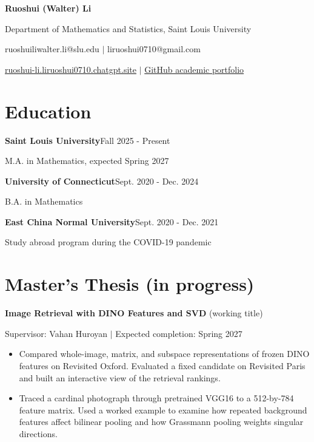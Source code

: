 \documentclass[10pt,letterpaper]{article}
\newcommand{\entry}[3]{\par\textbf{#1}\hfill #2\par#3\par}
\begin{document}
\fontsize{9.2}{11.5}\selectfont
{\fontsize{22}{25}\selectfont\bfseries Ruoshui (Walter) Li}\par
Department of Mathematics and Statistics, Saint Louis University\par
ruoshuiliwalter.li@slu.edu $\vert$ liruoshui0710@gmail.com\par
\href{https://ruoshui-li.liruoshui0710.chatgpt.site}{ruoshui-li.liruoshui0710.chatgpt.site} $\vert$
\href{https://github.com/Walter-Li17/academic-projects}{GitHub academic portfolio}

\section*{Education}
\entry{Saint Louis University}{Fall 2025 - Present}{M.A. in Mathematics, expected Spring 2027}
\entry{University of Connecticut}{Sept. 2020 - Dec. 2024}{B.A. in Mathematics}
\entry{East China Normal University}{Sept. 2020 - Dec. 2021}{Study abroad program during the COVID-19 pandemic}

\section*{Master's Thesis (in progress)}
\textbf{Image Retrieval with DINO Features and SVD} (working title)\par
Supervisor: Vahan Huroyan $\vert$ Expected completion: Spring 2027
\begin{itemize}
\item Compared whole-image, matrix, and subspace representations of frozen DINO features on Revisited Oxford. Evaluated a fixed candidate on Revisited Paris and built an interactive view of the retrieval rankings.
\item Traced a cardinal photograph through pretrained VGG16 to a 512-by-784 feature matrix. Used a worked example to examine how repeated background features affect bilinear pooling and how Grassmann pooling weights singular directions.
\end{itemize}
\end{document}
